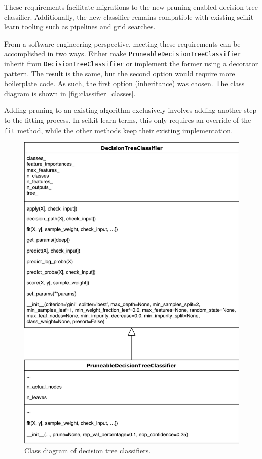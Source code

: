 These requirements facilitate migrations to the new pruning-enabled decision tree classifier. Additionally, the new classifier remains compatible with existing scikit-learn tooling such as pipelines and grid searches.

From a software engineering perspective, meeting these requirements can be accomplished in two ways. Either make \texttt{PruneableDecisionTreeClassifier} inherit from \texttt{DecisionTreeClassifier} or implement the former using a decorator pattern. The result is the same, but the second option would require more boilerplate code. As such, the first option (inheritance) was chosen. The class diagram is shown in \autoref{fig:classifier_classes}.

Adding pruning to an existing algorithm exclusively involves adding another step to the fitting process. In scikit-learn terms, this only requires an override of the \texttt{fit} method, while the other methods keep their existing implementation.

\begin{figure}[htp]
    \centering
    \includegraphics[width=\textwidth]{img/DecisionTreeClasses.pdf}
    \caption{Class diagram of decision tree classifiers.}%
    \label{fig:classifier_classes}
\end{figure}

